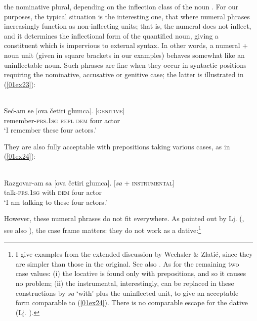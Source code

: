 \documentclass[output=paper,colorlinks,citecolor=brown]{langscibook}
\begin{document}
the nominative plural, depending on the inflection class of the noun \citep[159--160]{corbett2009}. For our purposes, the typical situation is the interesting one, that where numeral phrases increasingly function as non-inflecting units; that is, the numeral does not inflect, and it determines the inflectional form of the quantified noun, giving a constituent which is impervious to external syntax. In other words, a numeral + noun unit (given in square brackets in our examples) behaves somewhat like an uninflectable noun. Such phrases are fine when they occur in syntactic positions requiring the nominative, accusative or genitive case; the latter is illustrated in (\ref{01ex23}):

\begin{exe}
	\ex {} \citep[150]{wechslerzlatic2003} \label{01ex23} \\
	\gll Seć-am	se	[ova četiri glumca].\footnotemark \hspace{2cm} [\textsc{genitive}] \\
	remember-\textsc{prs.1sg} \textsc{refl} \textsc{dem} four actor \\
	\trans ‘I remember these four actors.’
\end{exe}


They are also fully acceptable with prepositions taking various cases, as in (\ref{01ex24}):

\begin{exe}
	\ex {} \citep[150]{wechslerzlatic2003} \label{01ex24} \\
	\gll Razgovar-am 	sa	[ova četiri glumca]. \hspace{1.5cm} [\textit{sa} + \textsc{instrumental}] \\
	talk-\textsc{prs.1sg}	with	\textsc{dem} four actor \\
	\trans ‘I am talking to these four actors.’
\end{exe}

However, these numeral phrases do not fit everywhere. As pointed out by Lj. \citeauthor{popovic1981-1982} (\citeyear{popovic1981-1982}, see also \citeyear{popovic1982}), the case frame matters: they do not work as a dative:\footnote{I give examples from the extended discussion by Wechsler \& Zlatić, since they are simpler than those in the original. See also \citet[374--375]{browne1993-serbocroat}. As for the remaining two case values: (i) the locative is found only with prepositions, and so it causes no problem; (ii) the instrumental, interestingly, can be replaced in these constructions by \textit{sa} `with' plus the uninflected unit, to give an acceptable form comparable to (\ref{01ex24}). There is no comparable escape for the dative (Lj. \citealt[606]{popovic1981-1982}).}
\end{document}

